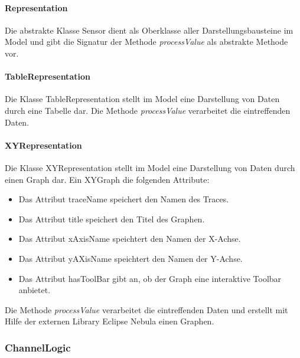 \documentclass[parskip=full]{scrartcl}
\begin{document}
\paragraph{Representation}
Die abstrakte Klasse Sensor dient als Oberklasse aller Darstellungsbausteine im Model und gibt die Signatur der Methode \textit{processValue} als abstrakte Methode vor.

\paragraph{TableRepresentation}
Die Klasse TableRepresentation stellt im Model eine Darstellung von Daten durch eine Tabelle dar. Die Methode \textit{processValue} verarbeitet die eintreffenden Daten.
\paragraph{XYRepresentation}
Die Klasse XYRepresentation stellt im Model eine Darstellung von Daten durch einen Graph dar. Ein XYGraph die folgenden Attribute:

\begin{itemize}

\item Das Attribut traceName speichert den Namen des Traces.
\item Das Attribut title speichert den Titel des Graphen.
\item Das Attribut xAxisName speichtert den Namen der X-Achse.
\item Das Attribut yAXisName speichtert den Namen der Y-Achse.
\item Das Attribut hasToolBar gibt an, ob der Graph eine interaktive Toolbar anbietet.

\end{itemize}

Die Methode \textit{processValue} verarbeitet die eintreffenden Daten und erstellt mit Hilfe der externen Library Eclipse Nebula einen Graphen.

\subsubsection{ChannelLogic}
\end{document}

